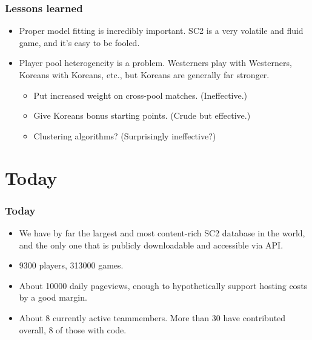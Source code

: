 \documentclass[color={usenames,dvipsnames}]{beamer}
\begin{document}
\begin{frame}
  \frametitle{Lessons learned}

  \begin{itemize}
  \item Proper model fitting is incredibly important. SC2 is a very volatile and fluid game, and it's
    easy to be fooled.
  \item Player pool heterogeneity is a problem. Westerners play with Westerners, Koreans with Koreans,
    etc., but Koreans are generally far stronger.
    \begin{itemize}
    \item Put increased weight on cross-pool matches. (Ineffective.)
    \item Give Koreans bonus starting points. (Crude but effective.)
    \item Clustering algorithms? (Surprisingly ineffective?)
    \end{itemize}
  \end{itemize}
\end{frame}

\section{Today}

\begin{frame}
  \frametitle{Today}

  \begin{itemize}
  \item We have by far the largest and most content-rich SC2 database in the world, and the only one
    that is publicly downloadable and accessible via API.
  \item \num{9300} players, \num{313000} games.
  \item About \num{10000} daily pageviews, enough to hypothetically support hosting costs by a good margin.
  \item About \num{8} currently active teammembers. More than \num{30} have contributed overall,
    \num{8} of those with code.
  \end{itemize}
\end{frame}
\end{document}
